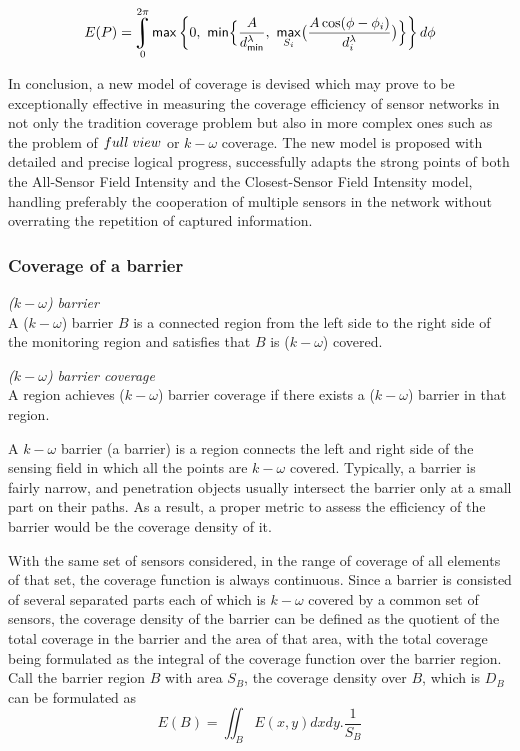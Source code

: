 $$E(P) = \uint\limits_0^{2\pi}{\mathsf{max}\left\{0,\ \mathsf{min}\Big\{\frac{A}{d_{\mathsf{min}}^\lambda}, \ \underset{S_i}{\mathsf{max}}\big(\frac{A\cos(\phi - \phi_i)}{d_i^\lambda}\big)\Big\}\right\}d\phi}$$

In conclusion, a new model of coverage is devised which may prove to be exceptionally effective in measuring the coverage efficiency of sensor networks in not only the tradition coverage problem but also in more complex ones such as the problem of $full\hspace{1mm}view$ or $k-\omega$ coverage. The new model is proposed with detailed and precise logical progress, successfully adapts the strong points of both the All-Sensor Field Intensity and the Closest-Sensor Field Intensity model, handling preferably the cooperation of multiple sensors in the network without overrating the repetition of captured information.

\subsubsection{Coverage of a barrier}
\label{barrier}

\begin{df}{\itshape($k-\omega$) barrier}\\
	A ($k-\omega$) barrier $B$ is a connected region from the left side to the right side of the monitoring region and satisfies that $B$ is ($k-\omega$) covered.
\end{df}
\begin{df}{\itshape($k-\omega$) barrier coverage}\\
	A region achieves ($k-\omega$) barrier coverage if there exists a ($k-\omega$) barrier in that region.\par
\end{df}

A $k-\omega$ barrier (a barrier) is a region connects the left and right side of the sensing field in which all the points are $k-\omega$ covered. Typically, a barrier is fairly narrow, and penetration objects usually intersect the barrier only at a small part on their paths. As a result, a proper metric to assess the efficiency of the barrier would be the coverage density of it.

With the same set of sensors considered, in the range of coverage of all elements of that set, the coverage function is always continuous. Since a barrier is consisted of several separated parts each of which is $k-\omega$ covered by a common set of sensors, the coverage density of the barrier can be defined as the quotient of the total coverage in the barrier and the area of that area, with the total coverage being formulated as the integral of the coverage function over the barrier region. Call the barrier region $B$ with area $S_B$, the coverage density over $B$, which is $D_B$ can be formulated as
\begin{equation}
\label{eq5}
E(B) = \iint_B{E(x, y)dxdy}.\frac{1}{S_B}
\end{equation}

